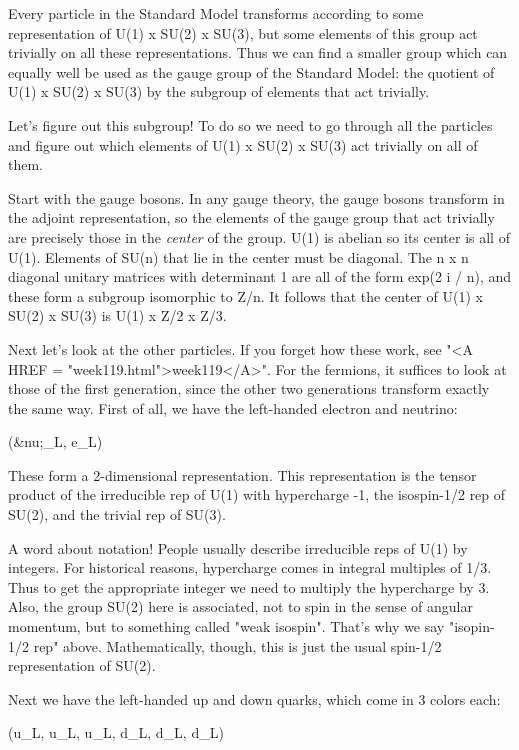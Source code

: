 Every particle in the Standard Model transforms according to some
representation of U(1) x SU(2) x SU(3), but some elements of this
group act trivially on all these representations.  Thus we can find
a smaller group which can equally well be used as the gauge group 
of the Standard Model: the quotient of U(1) x SU(2) x SU(3) 
by the subgroup of elements that act trivially.

Let's figure out this subgroup!  To do so we need to go through all
the particles and figure out which elements of U(1) x SU(2) x SU(3) 
act trivially on all of them.  

Start with the gauge bosons.  In any gauge theory, the gauge bosons
transform in the adjoint representation, so the elements of the gauge
group that act trivially are precisely those in the \emph{center} of the 
group.  U(1) is abelian so its center is all of U(1).  Elements of SU(n)
that lie in the center must be diagonal.  The n x n diagonal unitary 
matrices with determinant 1 are all of the form exp(2 \pi  i / n), 
and these form a subgroup isomorphic to Z/n.  It follows that the
center of U(1) x SU(2) x SU(3) is U(1) x Z/2 x Z/3.   

Next let's look at the other particles.  If you forget how these work,
see "<A HREF = "week119.html">week119</A>".  For the fermions, it suffices to look at those of the
first generation, since the other two generations transform exactly
the same way.  First of all, we have the left-handed electron and
neutrino:

(&nu;_L, e_L)                                

These form a 2-dimensional representation.  This representation is the
tensor product of the irreducible rep of U(1) with hypercharge -1, the
isospin-1/2 rep of SU(2), and the trivial rep of SU(3).   

A word about notation!  People usually describe irreducible reps of U(1)
by integers.  For historical reasons, hypercharge comes in integral
multiples of 1/3.  Thus to get the appropriate integer we need to 
multiply the hypercharge by 3.  Also, the group SU(2) here is
associated, not to spin in the sense of angular momentum, but to
something called "weak isospin".  That's why we say "isopin-1/2 rep"
above.  Mathematically, though, this is just the usual spin-1/2
representation of SU(2).   

Next we have the left-handed up and down quarks, which come in 3
colors each:

(u_L, u_L, u_L, d_L, d_L, d_L)              

